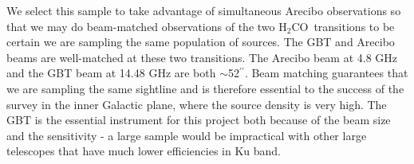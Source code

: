 \documentclass[11pt, preprint]{aastex}
\def\arcsec{$^{\prime\prime}$}
\newcommand{\formaldehyde}{H\ensuremath{_2}CO}
\begin{document}
We select this sample to take advantage of simultaneous Arecibo observations so
that we may do beam-matched observations of the two \formaldehyde\ transitions
to be certain we are sampling the same population of sources.  The GBT and
Arecibo beams are well-matched at these two transitions.  The Arecibo beam at
4.8 GHz and the GBT beam at 14.48 GHz are both $ \sim$52\arcsec .  Beam
matching guarantees that we are sampling the same sightline and is therefore
essential to the success of the survey in the inner Galactic plane, where the
source density is very high.  The GBT is the essential instrument for this
project both because of the beam size and the sensitivity - a large sample
would be impractical with other large telescopes that have much lower
efficiencies in Ku band.  





\end{document}
